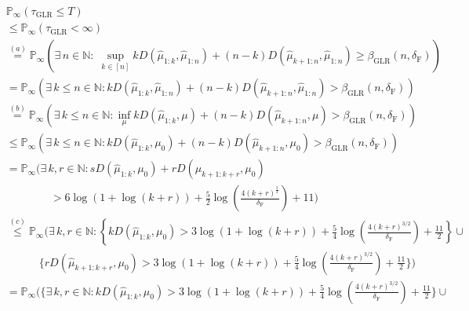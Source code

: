 \documentclass[12pt]{interact}
\newcommand{\lp}{\left(}
\newcommand{\rp}{\right)}
\newcommand{\lb}{\left[}
\newcommand{\rb}{\right]}
\newcommand{\lbp}{\left\{}
\newcommand{\rbp}{\right\}}
\newcommand{\mrm}{\mathrm}
\newcommand{\mbb}{\mathbb}
\renewcommand{\Pr}{\mathbb{P}}
\theoremstyle{plain}
\begin{document}
\begin{align}\nonumber
    &\Pr_{\infty}\lp \tau_{\mrm{GLR}} \leq T\rp\\\nonumber
    &\leq \Pr_{\infty}\lp \tau_{\mrm{GLR}}<\infty\rp\\\nonumber
    &\overset{(a)}{=}\Pr_{\infty}\lp\exists\,n\in\mbb{N}:\;\sup_{k\in\lb n \rb} k D \lp\hat{\mu}_{1:k},\hat{\mu}_{1:n}\rp+\lp n-k\rp D \lp\hat{\mu}_{k+1:n},\hat{\mu}_{1:n}\rp\geq\beta_{\mrm{GLR}} \lp n,\delta_{\mrm{F}}\rp\rp\\\nonumber
    &=\Pr_{\infty}\left(\exists\,k\leq n\in\mathbb{N}:k D (\hat{\mu}_{1:k},\hat{\mu}_{1:n})+(n-k) D (\hat{\mu}_{k+1:n},\hat{\mu}_{1:n})> \beta_{\mrm{GLR}} \lp n,\delta_{\mrm{F}}\rp\right)\\\nonumber
    &\overset{(b)}{=}\Pr_{\infty}\left(\exists\,k\leq n\in\mbb{N}:\inf_{\mu}k D (\hat{\mu}_{1:k},\mu)+(n-k) D (\hat{\mu}_{k+1:n},\mu)> \beta_{\mrm{GLR}}(n,\delta_{\mrm{F}})\right)\\\nonumber
    &\leq\Pr_{\infty}\left(\exists\,k\leq n\in\mathbb{N}:k D (\hat{\mu}_{1:k},\mu_{0})+(n-k) D (\hat{\mu}_{k+1:n},\mu_{0})> \beta_{\mrm{GLR}}(n,\delta_{\mrm{F}})\right)\\\nonumber
    &=\Pr_{\infty}\Bigg(\exists\,k,r\in\mathbb{N}: s D (\hat{\mu}_{1:k},\mu_{0})+r D (\hat{\mu}_{k+1:k+r},\mu_{0})\\\nonumber
    &\quad\quad\quad\quad >6\log(1+\log(k+r))+\frac{5}{2}\log\lp\frac{4\lp k+r\rp^{\frac{3}{2}}}{\delta_{\mrm{F}}}\rp+11\Bigg)\\\nonumber
    &\overset{(c)}{\leq}\Pr_{\infty}\Bigg(\exists\,k,r\in\mathbb{N}:\lbp k D (\hat{\mu}_{1:k},\mu_{0})>3\log(1+\log(k+r))+\frac{5}{4}\log\lp\frac{4\lp k+r\rp^{3/2}}{\delta_{\mrm{F}}}\rp+\frac{11}{2}\rbp\cup\\\nonumber
    &\quad\quad\quad\Bigg\{ r D (\hat{\mu}_{k+1:k+r},\mu_{0}) > 3\log(1+\log(k+r)) +\frac{5}{4}\log\lp\frac{4\lp k+r\rp^{3/2}}{\delta_{\mrm{F}}}\rp+\frac{11}{2} \Bigg\} \Bigg)\\\nonumber
    &=\Pr_{\infty}\Bigg(\Bigg\{\exists\,k,r\in\mathbb{N}:k D (\hat{\mu}_{1:k},\mu_{0})>3\log(1+\log(k+r))+\frac{5}{4}\log\lp\frac{4\lp k+r\rp^{3/2}}{\delta_{\mrm{F}}}\rp+\frac{11}{2}\Bigg\}\cup\\\nonumber

\end{align}
\end{document}
